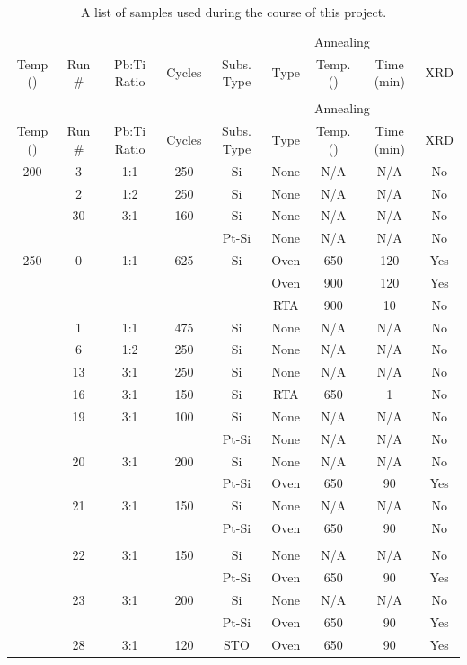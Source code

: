 {\tiny
\begin{longtable}{c c c c c c c c c}
	\caption[List of Samples]{A list of samples used during the course of this project.%
	\label{tbl:LoSamples2}}\\
	\toprule
	&&&&&\multicolumn{3}{c}{Annealing}&\\ \cmidrule{6-8}
	Temp (\degC{}) & Run \#& Pb:Ti Ratio & Cycles & Subs. Type & Type & Temp. (\degC{}) & Time (min) & XRD\\ \midrule%
	\endfirsthead
	\caption[]{A list of samples used during the course of this project.}\\
	\toprule
	&&&&&\multicolumn{3}{c}{Annealing}&\\ \cmidrule{6-8}
	Temp (\degC{})& Run \# & Pb:Ti Ratio & Cycles & Subs. Type & Type & Temp. (\degC{}) & Time (min) & XRD\\ \midrule%
	\endhead
	200	&3		&1:1		&250	&Si		&None	&N/A		&N/A		&No\\
		&2		&1:2		&250	&Si		&None	&N/A		&N/A		&No\\
		&30		&3:1		&160	&Si		&None	&N/A		&N/A		&No\\
		&		&		&		&Pt-Si	&None	&N/A		&N/A		&No\\ \midrule
	250	&0		&1:1		&625	&Si		&Oven	&650	&120	&Yes\\
		&		&		&		&		&Oven	&900	&120	&Yes\\
		&		&		&		&		&RTA	&900	&10		&No\\
		&1		&1:1		&475	&Si		&None	&N/A		&N/A		&No\\
		&6		&1:2		&250	&Si		&None 	&N/A		&N/A		&No\\
		&13		&3:1		&250	&Si		&None 	&N/A		&N/A		&No\\
		&16		&3:1		&150	&Si		&RTA	&650	&1		&No\\
		&19		&3:1		&100	&Si		&None 	&N/A		&N/A		&No\\
		&		&		&		&Pt-Si	&None 	&N/A		&N/A		&No\\
		&20		&3:1		&200	&Si		&None 	&N/A		&N/A		&No\\
		&		&		&		&Pt-Si	&Oven	&650	&90		&Yes\\
		&21		&3:1		&150	&Si		&None 	&N/A		&N/A		&No\\
		&		&		&		&Pt-Si	&Oven	&650	&90		&No\\ \\
		&22		&3:1		&150	&Si		&None 	&N/A		&N/A		&No\\
		&		&		&		&Pt-Si	&Oven	&650	&90		&Yes\\
		&23		&3:1		&200	&Si		&None 	&N/A		&N/A		&No\\
		&		&		&		&Pt-Si	&Oven	&650	&90		&Yes\\
		&28		&3:1		&120	&STO	&Oven	&650	&90		&Yes\\
	\bottomrule
\end{longtable}}
\clearpage
